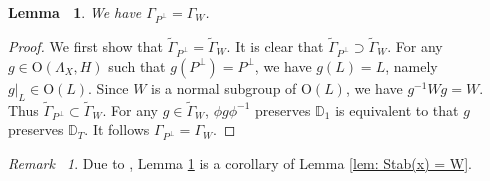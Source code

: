 \documentclass[12pt,reqno,a4paper]{amsart}
\newtheorem{lem}[thm]{Lemma~}
\theoremstyle{remark}
\newtheorem{rmk}[thm]{Remark~}
\theoremstyle{definition}
\begin{document}
\begin{lem}
\label{lem: Gamma_P^perp = Gamma_W}
    We have $\Gamma_{P^\perp}=\Gamma_W$.
\end{lem}
\begin{proof}
    We first show that $\widetilde\Gamma_{P^\perp}=\widetilde\Gamma_W$.
    It is clear that $\widetilde\Gamma_{P^\perp} \supset \widetilde\Gamma_W$.
    For any $g\in\mathrm{O}(\Lambda_X,H)$ such that $g(P^\perp)=P^\perp$, we have $g(L)=L$, namely $g|_L\in\mathrm{O}(L)$.
    Since $W$ is a normal subgroup of $\mathrm{O}(L)$, we have $g^{-1}Wg=W$.
    Thus $\widetilde\Gamma_{P^\perp} \subset \widetilde\Gamma_W$.
    For any $g\in\widetilde\Gamma_W$, $\phi g\phi^{-1}$ preserves $\mathbb{D}_1$ is equivalent to that $g$ preserves $\mathbb{D}_T$.
    It follows $\Gamma_{P^\perp}=\Gamma_W$.
\end{proof}

\begin{rmk}
    Due to \cite[Lemma A.4]{yu2020fourfolds}, Lemma \ref{lem: Gamma_P^perp = Gamma_W} is a corollary of Lemma \ref{lem: Stab(x) = W}.
\end{rmk}
\end{document}
